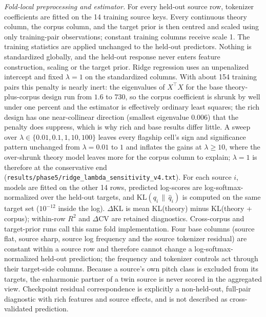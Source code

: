 \documentclass[11pt]{article}
\begin{document}
\emph{Fold-local preprocessing and estimator.} For every held-out source row, tokenizer coefficients are fitted on the 14 training source keys. Every continuous theory column, the corpus column, and the target prior is then centred and scaled using only training-pair observations; constant training columns receive scale 1. The training statistics are applied unchanged to the held-out predictors. Nothing is standardized globally, and the held-out response never enters feature construction, scaling or the target prior. Ridge regression uses an unpenalized intercept and fixed $\lambda=1$ on the standardized columns. With about 154 training pairs this penalty is nearly inert: the eigenvalues of $X^{\top}X$ for the base theory-plus-corpus design run from $1.6$ to $730$, so the corpus coefficient is shrunk by well under one percent and the estimator is effectively ordinary least squares; the rich design has one near-collinear direction (smallest eigenvalue $0.006$) that the penalty does suppress, which is why rich and base results differ little. A sweep over $\lambda\in\{0.01,0.1,1,10,100\}$ leaves every flagship cell's sign and significance pattern unchanged from $\lambda=0.01$ to $1$ and inflates the gains at $\lambda\ge10$, where the over-shrunk theory model leaves more for the corpus column to explain; $\lambda=1$ is therefore at the conservative end (\texttt{results/phase5/ridge\_lambda\_sensitivity\_v4.txt}). For each source $i$, models are fitted on the other 14 rows, predicted log-scores are log-softmax-normalized over the held-out targets, and $\mathrm{KL}(q_i\,\|\,\hat q_i)$ is computed on the same target set ($10^{-12}$ inside the log). $\Delta\mathrm{KL}$ is mean KL(theory) minus KL(theory + corpus); within-row $R^2$ and $\Delta$CV are retained diagnostics. Cross-corpus and target-prior runs call this same fold implementation. Four base columns (source flat, source sharp, source log frequency and the source tokenizer residual) are constant within a source row and therefore cannot change a log-softmax-normalized held-out prediction; the frequency and tokenizer controls act through their target-side columns. Because a source's own pitch class is excluded from its targets, the enharmonic partner of a twin source is never scored in the aggregated view. Checkpoint residual correspondence is explicitly a non-held-out, full-pair diagnostic with rich features and source effects, and is not described as cross-validated prediction.
\end{document}
